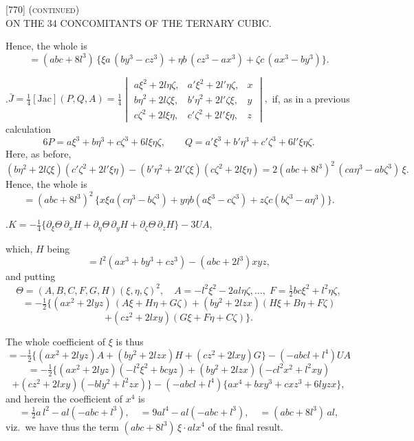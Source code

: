 \documentclass[11pt,a4paper]{article}
\begin{document}

\begin{center}
\textsc{[770] (continued)}\\[2pt]
\textsc{ON THE 34 CONCOMITANTS OF THE TERNARY CUBIC.}
\end{center}

\bigskip

\noindent
Hence, the whole is
\[
  =(abc+8l^{3})\,\{\xi a\,(by^{3}-cz^{3})+\eta b\,(cz^{3}-ax^{3})+\zeta c\,(ax^{3}-by^{3})\}.
\]

\medskip{}.\quad $\bar J=\tfrac{1}{4}[\mathrm{Jac}](P,Q,A)=\tfrac{1}{4}\begin{vmatrix}
  a\xi^{2}+2l\eta\zeta, & a'\xi^{2}+2l'\eta\zeta, & x\\
  b\eta^{2}+2l\zeta\xi, & b'\eta^{2}+2l'\zeta\xi, & y\\
  c\zeta^{2}+2l\xi\eta, & c'\zeta^{2}+2l'\xi\eta, & z
\end{vmatrix},$
if, as in a previous calculation
\[
  6P=a\xi^{3}+b\eta^{3}+c\zeta^{3}+6l\xi\eta\zeta,\qquad
  Q=a'\xi^{3}+b'\eta^{3}+c'\zeta^{3}+6l'\xi\eta\zeta.
\]
Here, as before,
\[
  (b\eta^{2}+2l\zeta\xi)(c'\zeta^{2}+2l'\xi\eta)-(b'\eta^{2}+2l'\zeta\xi)(c\zeta^{2}+2l\xi\eta)
  =2(abc+8l^{3})^{2}\,(ca\eta^{3}-ab\zeta^{3})\,\xi.
\]
Hence, the whole is
\[
  =(abc+8l^{3})^{2}\,\{x\xi a(c\eta^{3}-b\zeta^{3})+y\eta b(a\xi^{3}-c\zeta^{3})+z\zeta c(b\zeta^{3}-a\eta^{3})\}.
\]

\medskip{}.\quad $K=-\tfrac{1}{4}\{\partial_{\xi}\Theta\,\partial_{x}H+\partial_{\eta}\Theta\,\partial_{y}H+\partial_{\zeta}\Theta\,\partial_{z}H\}-3UA,$

which, $H$ being
\[
  =l^{2}(ax^{3}+by^{3}+cz^{3})-(abc+2l^{3})xyz,
\]
and putting
\[
  \Theta=(A,B,C,F,G,H)(\xi,\eta,\zeta)^{2},\quad A=-l^{2}\xi^{2}-2al\eta\zeta,\ldots,\;F=\tfrac{1}{2}bc\xi^{2}+l^{2}\eta\zeta,
\]
\[
  =-\tfrac{1}{2}\{(ax^{2}+2lyz)\,(A\xi+H\eta+G\zeta)
  +(by^{2}+2lzx)(H\xi+B\eta+F\zeta)
\]
\[
  +(cz^{2}+2lxy)(G\xi+F\eta+C\zeta)\}.
\]

The whole coefficient of $\xi$ is thus
\[
  =-\tfrac{1}{2}\{(ax^{2}+2lyz)A+(by^{2}+2lzx)H+(cz^{2}+2lxy)G\}-(-abcl+l^{4})UA
\]
\[
  =-\tfrac{1}{2}\{(ax^{2}+2lyz)(-l^{2}\xi^{2}+bcyz)+(by^{2}+2lzx)(-cl^{2}x^{2}+l^{2}xy)
\]
\[
  +(cz^{2}+2lxy)(-bly^{2}+l^{2}zx)\}-(-abcl+l^{4})\{ax^{4}+bxy^{3}+cxz^{3}+6lyz x\},
\]
and herein the coefficient of $x^{4}$ is
\[
  =\tfrac{1}{2}a\,l^{2}-al(-abc+l^{3}),\quad =9al^{4}-al(-abc+l^{3}),\quad =(abc+8l^{3})\,al,
\]
viz.\ we have thus the term $(abc+8l^{3})\,\xi\cdot alx^{4}$ of the final result.
\end{document}

